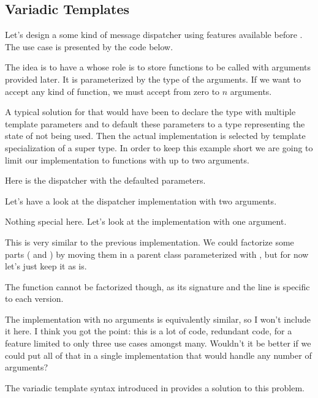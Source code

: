 \subsection{Variadic Templates}

Let's design a some kind of message dispatcher using features
available before . The use case is presented by the code below.



The idea is to have a  whose role is to store
functions to be called with arguments provided later. It is
parameterized by the type of the arguments. If we want to accept any
kind of function, we must accept from zero to $n$ arguments.

A typical solution for that would have been to declare the type with
multiple template parameters and to default these parameters to a type
representing the state of not being used. Then the actual
implementation is selected by template specialization of a super
type. In order to keep this example short we are going to limit our
implementation to functions with up to two arguments.

Here is the dispatcher with the defaulted parameters.



Let's have a look at the dispatcher implementation with two arguments.



Nothing special here. Let's look at the implementation with one
argument.



This is very similar to the previous implementation. We could
factorize some parts ( and ) by
moving them in a parent class parameterized with
, but for now let's just keep it as is.

The  function cannot be factorized though, as its
signature and the  line is specific to
each version.

The implementation with no arguments is equivalently similar, so I
won't include it here. I think you got the point: this is a lot of
code, redundant code, for a feature limited to only three use cases
amongst many. Wouldn't it be better if we could put all of that in a
single implementation that would handle any number of arguments?

\bigskip

The variadic template syntax introduced in  provides a solution
to this problem.
